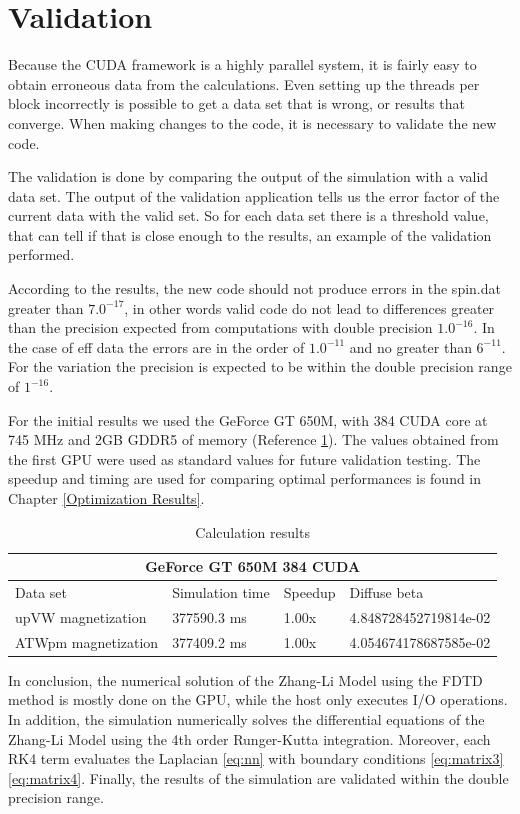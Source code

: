 \section{Validation}

Because the CUDA framework is a highly parallel system, it is fairly easy to obtain erroneous data from the calculations. Even setting up the threads per block incorrectly is possible to get a data set that is wrong, or results that converge. When making changes to the code, it is necessary to validate the new code.

The validation is done by comparing the output of the simulation with a valid data set. The output of the validation application tells us the error factor of the current data with the valid set. So for each data set there is a threshold value, that can tell if that is close enough to the results, an example of the validation performed.

According to the results, the new code should not produce errors in the spin.dat greater than $7.0^{-17}$, in other words valid code do not lead to differences greater than the precision expected from computations with double precision $1.0^{-16}$. In the case of eff data the errors are in the order of $1.0^{-11}$ and no greater than $6^{-11}$. For the variation the precision is expected to be within the double precision range of $1^{-16}$. 

For the initial results we used the GeForce GT 650M, with 384 CUDA core at 745 MHz and 2GB GDDR5 of memory (Reference \ref{tab:results}). The values obtained from the first GPU were used as standard values for future validation testing. The speedup and timing are used for comparing optimal performances is found in Chapter \ref{Optimization Results}.

\begin{table}[h]
\centering
\begin{tabular}{| l | l | l | l |}
\hline
\multicolumn{4}{|c|}{GeForce GT 650M  384 CUDA} \\
\hline
Data set & Simulation time & Speedup & Diffuse beta  \\
\hline
upVW magnetization & 377590.3 ms & 1.00x & 4.848728452719814e-02 \\
\hline
ATWpm magnetization & 377409.2 ms & 1.00x & 4.054674178687585e-02 \\
\hline
\end{tabular}
\caption{Calculation results}
\label{tab:results}
\end{table}


\vspace{4.0em}

In conclusion, the numerical solution of the Zhang-Li Model using the FDTD method is mostly done on the GPU, while the host only executes I/O operations. In addition, the simulation numerically solves the differential equations of the Zhang-Li Model using the 4th order Runger-Kutta integration. Moreover, each RK4 term evaluates the Laplacian \ref{eq:nn} with boundary conditions \ref{eq:matrix3} \ref{eq:matrix4}. Finally, the results of the simulation are validated within the double precision range.



